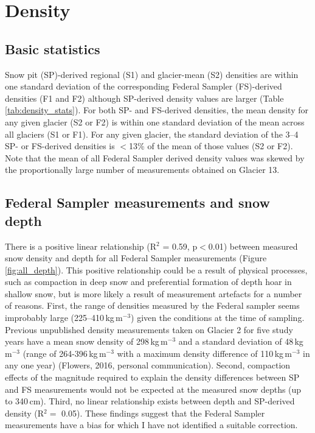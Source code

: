 \documentclass{sfuthesis}
\begin{document}
\section{Density}
\label{sec:density}

\subsection{Basic statistics}

Snow pit (SP)-derived regional (S1) and glacier-mean (S2) densities are within one standard deviation of the corresponding Federal Sampler (FS)-derived densities (F1 and F2) although SP-derived density values are larger (Table \ref{tab:density_stats}). For both SP- and FS-derived densities, the mean density for any given glacier (S2 or F2) is within one standard deviation of the mean across all glaciers (S1 or F1). For any given glacier, the standard deviation of the 3--4 SP- or FS-derived densities is $<$13\% of the mean of those values (S2 or F2). Note that the mean of all Federal Sampler derived density values was skewed by the proportionally large number of measurements obtained on Glacier 13.

\subsection{Federal Sampler measurements and snow depth}
\label{sec:FSdensity&depth}

There is a positive linear relationship (R$^2$ = 0.59, p$<$0.01) between measured snow density and depth for all Federal Sampler measurements (Figure \ref{fig:all_depth}). This positive relationship could be a result of physical processes, such as compaction in deep snow and preferential formation of depth hoar in shallow snow, but is more likely a result of measurement artefacts for a number of reasons. First, the range of densities measured by the Federal sampler seems improbably large (225--410\,kg\,m$^{-3}$) given the conditions at the time of sampling. Previous unpublished density measurements taken on Glacier 2 for five study years have a mean snow density of 298\,kg\,m$^{-3}$ and a standard deviation of 48\,kg\,m$^{-3}$ (range of 264-396\,kg\,m$^{-3}$ with a maximum density difference of 110\,kg\,m$^{-3}$ in any one year) (Flowers, 2016, personal communication). Second, compaction effects of the magnitude required to explain the density differences between SP and FS measurements would not be expected at the measured snow depths (up to 340\,cm). Third, no linear relationship exists between depth and SP-derived density (R$^2 =$ 0.05). These findings suggest that the Federal Sampler measurements have a bias for which I have not identified a suitable correction. 
\end{document}

